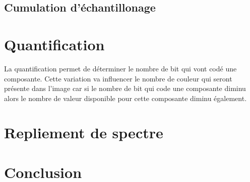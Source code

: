 \documentclass[a4paper,11pt]{article}
\begin{document}
  \subsection{Cumulation d'échantillonage}
  
  \section{Quantification}
  La quantification permet de déterminer le nombre de bit qui vont codé une composante. Cette variation
  va influencer le nombre de couleur qui seront présente dans l'image car si le nombre de bit qui code
  une composante diminu alors le nombre de valeur disponible pour cette composante diminu également.
  
  \section{Repliement de spectre}
  
  \section*{Conclusion}
 
    
\end{document}
